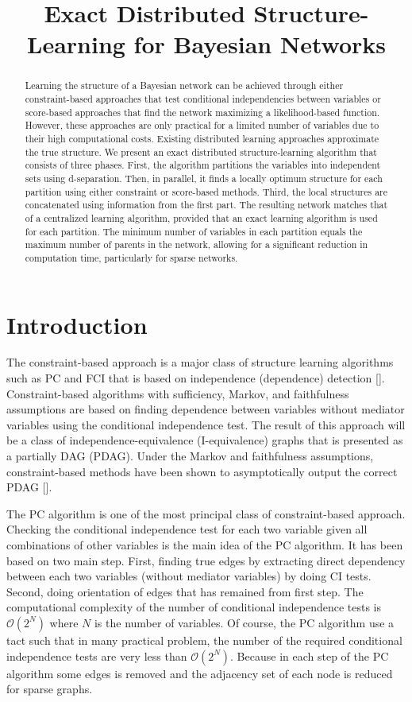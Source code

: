 \documentclass{article}
\title{Exact Distributed Structure-Learning for Bayesian Networks}
\author{}
\newcommand{\Oo}{\mathcal{O}}
\begin{document}
\maketitle

\begin{abstract}
Learning the structure of a Bayesian network can be achieved through either constraint-based approaches that test conditional independencies between variables or score-based approaches that find the network maximizing a likelihood-based function. However, these approaches are only practical for a limited number of variables due to their high computational costs. Existing distributed learning approaches approximate the true structure. We present an exact distributed structure-learning algorithm that consists of three phases. First, the algorithm partitions the variables into independent sets using d-separation. Then, in parallel, it finds a locally optimum structure for each partition using either constraint or score-based methods. Third, the local structures are concatenated using information from the first part. The resulting network matches that of a centralized learning algorithm, provided that an exact learning algorithm is used for each partition. The minimum number of variables in each partition equals the maximum number of parents in the network, allowing for a significant reduction in computation time, particularly for sparse networks.
\end{abstract}

\section{Introduction}
The constraint-based approach is a major class of structure learning algorithms such as PC and FCI that is based on independence (dependence) detection []. 
Constraint-based algorithms with sufficiency, Markov, and faithfulness assumptions are based on finding dependence between variables without mediator variables using the conditional independence test. 
The result of this approach will be a class of independence-equivalence (I-equivalence) graphs that is presented as a partially DAG (PDAG). 
Under the Markov and faithfulness assumptions, constraint-based methods have been shown to asymptotically output the correct PDAG []. 

The PC algorithm is one of the most principal class of constraint-based approach.
Checking the conditional independence test for each two variable given all combinations of other variables is the main idea of the PC algorithm. 
It has been based on two main step.
First, finding true edges by extracting  direct dependency between each two variables (without mediator variables) by doing CI tests. 
Second, doing orientation of edges that has remained from first step. 
The computational complexity of the number of conditional independence tests is $\Oo(2^N)$ where $N$ is the number of variables. 
Of course, the PC algorithm use a tact such that in many practical problem, the number of the required conditional independence tests are very less than $\Oo (2^N)$.
Because in each step of the PC algorithm some edges is removed and the adjacency set of each node is reduced for sparse graphs. 
\end{document}
